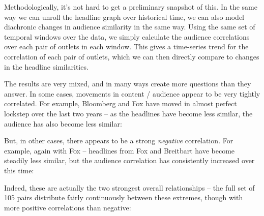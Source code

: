 \documentclass{scrartcl}
\begin{document}
Methodologically, it's not hard to get a preliminary snapshot of this. In the same way we can unroll the headline graph over historical time, we can also model diachronic changes in audience similarity in the same way. Using the same set of temporal windows over the data, we simply calculate the audience correlations over each pair of outlets in each window. This gives a time-series trend for the correlation of each pair of outlets, which we can then directly compare to changes in the headline similarities.

The results are very mixed, and in many ways create more questions than they answer. In some cases, movements in content / audience appear to be very tightly correlated. For example, Bloomberg and Fox have moved in almost perfect lockstep over the last two years -- as the headlines have become less similar, the audience has also become less similar:


But, in other cases, there appears to be a strong \textit{negative} correlation. For example, again with Fox -- headlines from Fox and Breitbart have become steadily less similar, but the audience correlation has consistently increased over this time:

%
%
%
%

Indeed, these are actually the two strongest overall relationships -- the full set of 105 pairs distribute fairly continuously between these extremes, though with more positive correlations than negative:

\end{document}

